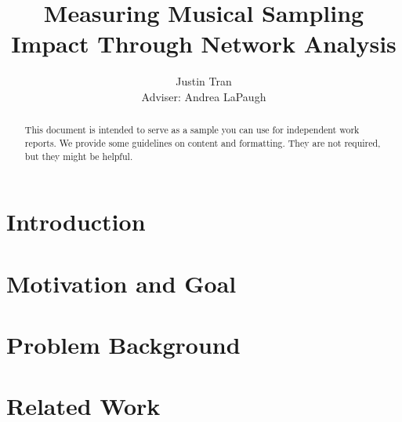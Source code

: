 \documentclass[pageno]{jpaper}
\begin{document}
\title{Measuring Musical Sampling Impact Through Network Analysis}

\author{Justin Tran\\Adviser: Andrea LaPaugh}

\date{}
\maketitle

\thispagestyle{empty}
\doublespacing
\begin{abstract}
This document is intended to serve as a sample you can use for independent work reports.  We provide some guidelines on content and formatting.  They are not required, but they might be helpful.
\end{abstract}

\section{Introduction}

\section{Motivation and Goal}

\section{Problem Background}

\section{Related Work}
\end{document}
